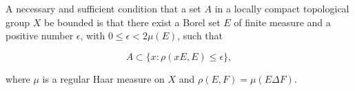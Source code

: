 A necessary and sufficient condition that a set $A$ in a locally compact topological group $X$ be bounded is that there exist a Borel set $E$ of finite measure and a positive number $\epsilon$, with $0 \leq \epsilon < 2\mu(E)$, such that

$$A \subset \{x: \rho(xE,E) \leq \epsilon\},$$

where $\mu$ is a regular Haar measure on $X$ and $\rho(E,F) = \mu(E \Delta F)$.
